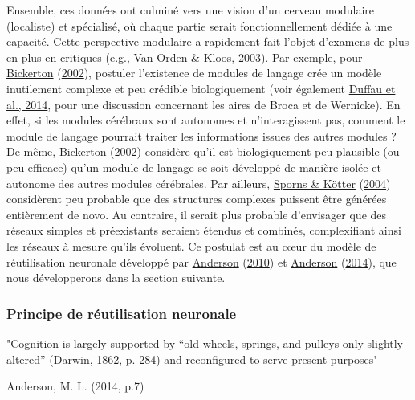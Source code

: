 \documentclass[
  a4paper,12pt,twoside,onecolumn,openright,final,oldfontcommands]{memoir}
\begin{document}
Ensemble, ces données ont culminé vers une vision d'un cerveau modulaire (localiste) et spécialisé, où chaque partie serait fonctionnellement dédiée à une capacité. Cette perspective modulaire a rapidement fait l'objet d'examens de plus en plus en critiques (e.g., \protect\hyperlink{ref-van_orden_module_2003}{Van Orden \& Kloos, 2003}). Par exemple, pour \protect\hyperlink{ref-bickerton_language_2002}{Bickerton} (\protect\hyperlink{ref-bickerton_language_2002}{2002}), postuler l'existence de modules de langage crée un modèle inutilement complexe et peu crédible biologiquement (voir également \protect\hyperlink{ref-duffau_re-examination_2014}{Duffau et al., 2014}, pour une discussion concernant les aires de Broca et de Wernicke). En effet, si les modules cérébraux sont autonomes et n'interagissent pas, comment le module de langage pourrait traiter les informations issues des autres modules ? De même, \protect\hyperlink{ref-bickerton_language_2002}{Bickerton} (\protect\hyperlink{ref-bickerton_language_2002}{2002}) considère qu'il est biologiquement peu plausible (ou peu efficace) qu'un module de langage se soit développé de manière isolée et autonome des autres modules cérébrales. Par ailleurs, \protect\hyperlink{ref-sporns_motifs_2004}{Sporns \& Kötter} (\protect\hyperlink{ref-sporns_motifs_2004}{2004}) considèrent peu probable que des structures complexes puissent être générées entièrement de novo. Au contraire, il serait plus probable d'envisager que des réseaux simples et préexistants seraient étendus et combinés, complexifiant ainsi les réseaux à mesure qu'ils évoluent. Ce postulat est au c\oe ur du modèle de réutilisation neuronale développé par \protect\hyperlink{ref-anderson_neural_2010}{Anderson} (\protect\hyperlink{ref-anderson_neural_2010}{2010}) et \protect\hyperlink{ref-anderson_after_2014}{Anderson} (\protect\hyperlink{ref-anderson_after_2014}{2014}), que nous développerons dans la section suivante.

\hypertarget{principe-reuse}{%
\subsubsection{Principe de réutilisation neuronale}\label{principe-reuse}}

\epigraph{"Cognition is largely supported by “old wheels, springs, and pulleys only slightly altered” (Darwin, 1862, p. 284) and reconfigured to serve present purposes"}{Anderson, M. L. (2014, p.7)}
\end{document}

